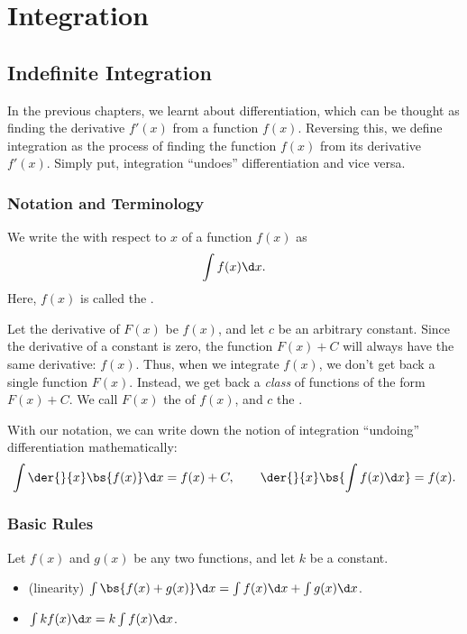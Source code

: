 \chapter{Integration}

\section{Indefinite Integration}

In the previous chapters, we learnt about differentiation, which can be thought as finding the derivative $f'(x)$ from a function $f(x)$. Reversing this, we define integration as the process of finding the function $f(x)$ from its derivative $f'(x)$. Simply put, integration ``undoes'' differentiation and vice versa.

\subsection{Notation and Terminology}

\begin{definition}
    We write the  with respect to $x$ of a function $f(x)$ as \[\int f(x) \d x.\] Here, $f(x)$ is called the .
\end{definition}

Let the derivative of $F(x)$ be $f(x)$, and let $c$ be an arbitrary constant. Since the derivative of a constant is zero, the function $F(x) + C$ will always have the same derivative: $f(x)$. Thus, when we integrate $f(x)$, we don't get back a single function $F(x)$. Instead, we get back a \textit{class} of functions of the form $F(x) + C$. We call $F(x)$ the  of $f(x)$, and $c$ the .

With our notation, we can write down the notion of integration ``undoing'' differentiation mathematically: \[\int \der{}{x} \bs{f(x)} \d x = f(x) + C, \qquad \der{}{x} \bs{\int f(x) \d x} = f(x).\]

\subsection{Basic Rules}

\begin{fact}
    Let $f(x)$ and $g(x)$ be any two functions, and let $k$ be a constant.
    \begin{itemize}
        \item (linearity) $\int \bs{f(x) + g(x)} \d x = \int f(x) \d x + \int g(x) \d x$.
        \item $\int k f(x) \d x = k \int f(x) \d x$.
    \end{itemize}
\end{fact}

